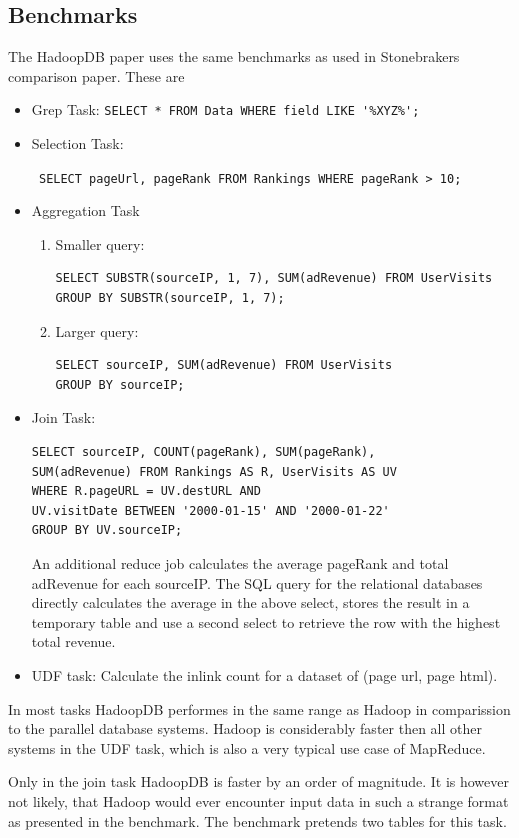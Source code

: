 \documentclass[12pt,a4paper]{scrartcl}		%
\begin{document}
\subsection{Benchmarks}
The HadoopDB paper uses the same benchmarks as used in Stonebrakers comparison paper. These are
\begin{itemize}
\item Grep Task: \verb+SELECT * FROM Data WHERE field LIKE '%XYZ%';+
\item Selection Task: 

\verb+ SELECT pageUrl, pageRank FROM Rankings WHERE pageRank > 10;+
\item Aggregation Task
  \begin{enumerate}
  \item Smaller query:
\begin{verbatim}
SELECT SUBSTR(sourceIP, 1, 7), SUM(adRevenue) FROM UserVisits 
GROUP BY SUBSTR(sourceIP, 1, 7);
\end{verbatim}

  \item Larger query:
\begin{verbatim}
SELECT sourceIP, SUM(adRevenue) FROM UserVisits 
GROUP BY sourceIP;
\end{verbatim}

  \end{enumerate}
  \item Join Task:
\begin{verbatim}
SELECT sourceIP, COUNT(pageRank), SUM(pageRank),
SUM(adRevenue) FROM Rankings AS R, UserVisits AS UV
WHERE R.pageURL = UV.destURL AND
UV.visitDate BETWEEN '2000-01-15' AND '2000-01-22'
GROUP BY UV.sourceIP;
\end{verbatim}
An additional reduce job calculates the average pageRank and total adRevenue for each sourceIP. The SQL query for the relational databases directly calculates the average in the above select, stores the result in a temporary table and use a second select to retrieve the row with the highest total revenue.
  \item UDF task: Calculate the inlink count for a dataset of (page url, page html).
\end{itemize}
In most tasks HadoopDB performes in the same range as Hadoop in comparission to the parallel database systems. Hadoop is considerably faster then all other systems in the UDF task, which is also a very typical use case of MapReduce.

Only in the join task HadoopDB is faster by an order of magnitude. It is however not likely, that Hadoop would ever encounter input data in such a strange format as presented in the benchmark. The benchmark pretends two tables for this task.
\end{document}
